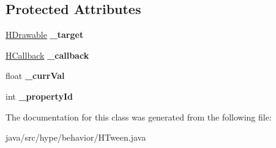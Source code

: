 \subsection*{Protected Attributes}
\begin{DoxyCompactItemize}
\item 
\hypertarget{classhype_1_1behavior_1_1_h_tween_ac5b429cf1e3caadb491c5f17de1d5b30}{\hyperlink{classhype_1_1drawable_1_1_h_drawable}{H\-Drawable} {\bfseries \-\_\-target}}\label{classhype_1_1behavior_1_1_h_tween_ac5b429cf1e3caadb491c5f17de1d5b30}

\item 
\hypertarget{classhype_1_1behavior_1_1_h_tween_af30be22943f5e767b21bb48a5b8a0d88}{\hyperlink{interfacehype_1_1interfaces_1_1_h_callback}{H\-Callback} {\bfseries \-\_\-callback}}\label{classhype_1_1behavior_1_1_h_tween_af30be22943f5e767b21bb48a5b8a0d88}

\item 
\hypertarget{classhype_1_1behavior_1_1_h_tween_a1237f8e693f4b0b01e1e5cfa6013a997}{float {\bfseries \-\_\-curr\-Val}}\label{classhype_1_1behavior_1_1_h_tween_a1237f8e693f4b0b01e1e5cfa6013a997}

\item 
\hypertarget{classhype_1_1behavior_1_1_h_tween_a571d76a999f6a22a58fdbd0d515359de}{int {\bfseries \-\_\-property\-Id}}\label{classhype_1_1behavior_1_1_h_tween_a571d76a999f6a22a58fdbd0d515359de}

\end{DoxyCompactItemize}


The documentation for this class was generated from the following file\-:\begin{DoxyCompactItemize}
\item 
java/src/hype/behavior/H\-Tween.\-java\end{DoxyCompactItemize}
